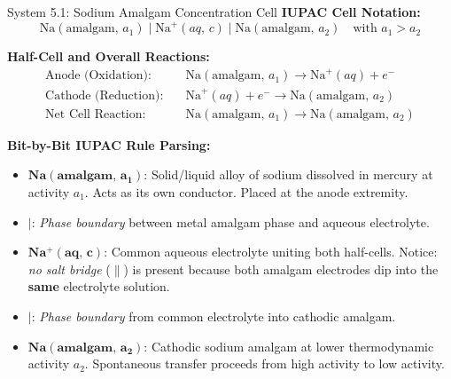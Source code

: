 \documentclass[10pt,a4paper]{article}
\begin{document}
\begin{examplebox}{System 5.1: Sodium Amalgam Concentration Cell}
\textbf{IUPAC Cell Notation:}
\begin{equation*}
    \text{Na}(\text{amalgam},\, a_1) \mid \text{Na}^+(aq,\, c) \mid \text{Na}(\text{amalgam},\, a_2) \quad \text{with } a_1 > a_2
\end{equation*}

\textbf{Half-Cell and Overall Reactions:}
\begin{align*}
    \text{Anode (Oxidation):} \quad & \text{Na}(\text{amalgam},\, a_1) \longrightarrow \text{Na}^+(aq) + e^- \\
    \text{Cathode (Reduction):} \quad & \text{Na}^+(aq) + e^- \longrightarrow \text{Na}(\text{amalgam},\, a_2) \\
    \text{Net Cell Reaction:} \quad & \text{Na}(\text{amalgam},\, a_1) \longrightarrow \text{Na}(\text{amalgam},\, a_2)
\end{align*}

\textbf{Bit-by-Bit IUPAC Rule Parsing:}
\begin{itemize}[leftmargin=*]
    \item $\mathbf{Na(\text{amalgam},\, a_1)}$: Solid/liquid alloy of sodium dissolved in mercury at activity $a_1$. Acts as its own conductor. Placed at the anode extremity.
    \item $\mathbf{\mid}$: \textit{Phase boundary} between metal amalgam phase and aqueous electrolyte.
    \item $\mathbf{Na^+(aq,\, c)}$: Common aqueous electrolyte uniting both half-cells. Notice: \textit{no salt bridge} ($\parallel$) is present because both amalgam electrodes dip into the \textbf{same} electrolyte solution.
    \item $\mathbf{\mid}$: \textit{Phase boundary} from common electrolyte into cathodic amalgam.
    \item $\mathbf{Na(\text{amalgam},\, a_2)}$: Cathodic sodium amalgam at lower thermodynamic activity $a_2$. Spontaneous transfer proceeds from high activity to low activity.
\end{itemize}
\end{examplebox}

\end{document}
